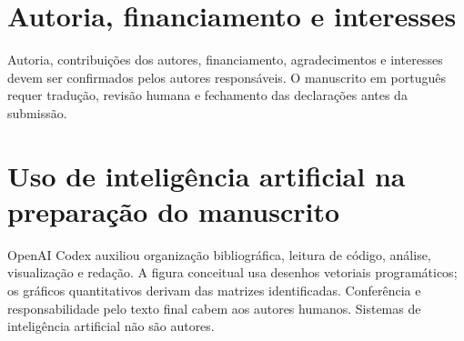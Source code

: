 \documentclass[preprint,12pt]{elsarticle}
\begin{document}
\section*{Autoria, financiamento e interesses}
Autoria, contribuições dos autores, financiamento, agradecimentos e interesses devem ser confirmados pelos autores responsáveis. O manuscrito em português requer tradução, revisão humana e fechamento das declarações antes da submissão.

\section*{Uso de inteligência artificial na preparação do manuscrito}
OpenAI Codex auxiliou organização bibliográfica, leitura de código, análise, visualização e redação. A figura conceitual usa desenhos vetoriais programáticos; os gráficos quantitativos derivam das matrizes identificadas. Conferência e responsabilidade pelo texto final cabem aos autores humanos. Sistemas de inteligência artificial não são autores.



\end{document}
